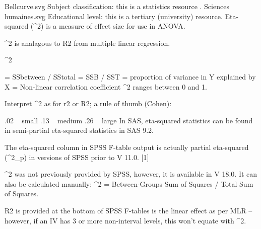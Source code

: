 Bellcurve.svg	Subject classification: this is a statistics resource .
Sciences humaines.svg	Educational level: this is a tertiary (university) resource.
Eta-squared (\eta^2) is a measure of effect size for use in ANOVA.

\eta^2 is analagous to R2 from multiple linear regression.

\eta^2

= SSbetween / SStotal = SSB / SST
= proportion of variance in Y explained by X
= Non-linear correlation coefficient
\eta^2 ranges between 0 and 1.

Interpret \eta^2 as for r2 or R2; a rule of thumb (Cohen):

.02 ~ small
.13 ~ medium
.26 ~ large
In SAS, eta-squared statistics can be found in semi-partial eta-squared statistics in SAS 9.2.

The eta-squared column in SPSS F-table output is actually partial eta-squared (\eta^2_p) in versions of SPSS prior to V 11.0. [1]

\eta^2 was not previously provided by SPSS, however, it is available in V 18.0. It can also be calculated manually: \eta^2 = Between-Groups Sum of Squares / Total Sum of Squares.

R2 is provided at the bottom of SPSS F-tables is the linear effect as per MLR – however, if an IV has 3 or more non-interval levels, this won’t equate with \eta^2.

